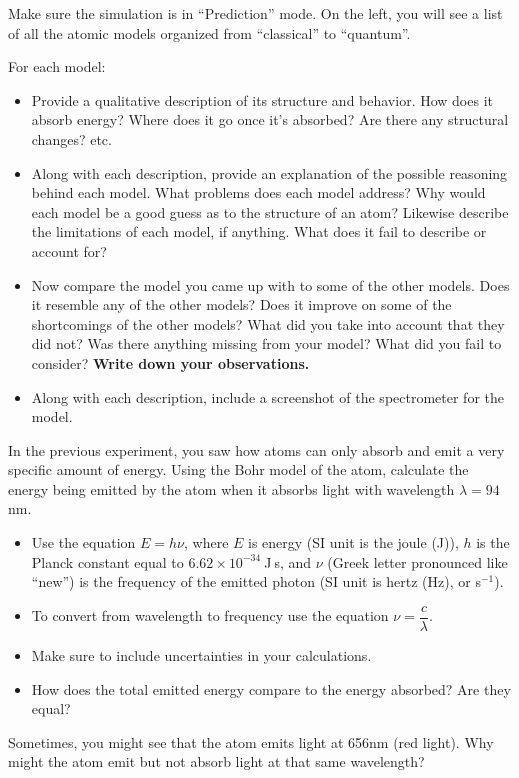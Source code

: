 \begin{steps}
	\item Make sure the simulation is in ``Prediction'' mode. On the left, you will see a list of all the atomic models organized from ``classical'' to ``quantum''.
	
	\item For each model:
	\begin{itemize}
		\item Provide a qualitative description of its structure and behavior. How does it absorb energy? Where does it go once it's absorbed? Are there any structural changes? etc. 
	
		\item Along with each description, provide an explanation of the possible reasoning behind each model. What problems does each model address? Why would each model be a good guess as to the structure of an atom? Likewise describe the limitations of each model, if anything. What does it fail to describe or account for?
	
		\item Now compare the model you came up with to some of the other models. Does it resemble any of the other models? Does it improve on some of the shortcomings of the other models? What did you take into account that they did not? Was there anything missing from your model? What did you fail to consider? \textbf{Write down your observations.}
	
		\item Along with each description, include a screenshot of the spectrometer for the model. 
	\end{itemize}
	
	\item In the previous experiment, you saw how atoms can only absorb and emit a very specific amount of energy. Using the Bohr model of the atom, calculate the energy being emitted by the atom when it absorbs light with wavelength $\lambda = 94$nm. 
	\begin{itemize}
		\item Use the equation $\mathit{E} = \mathit{h}\nu$, where $\mathit{E}$ is energy (SI unit is the joule (J)), $\mathit{h}$ is the Planck constant equal to $6.62 \times 10^{-34}\:$J$\:$s, and $\nu$ (Greek letter pronounced like ``new'') is the frequency of the emitted photon (SI unit is hertz (Hz), or s$^{-1}$).
		
		\item To convert from wavelength to frequency use the equation $\nu = \dfrac{c}{\lambda}$. 
		
		\item Make sure to include uncertainties in your calculations.
		
		\item How does the total emitted energy compare to the energy absorbed? Are they equal?
	\end{itemize}
	
	\item Sometimes, you might see that the atom emits light at 656nm (red light). Why might the atom emit but not absorb light at that same wavelength? 
\end{steps}

